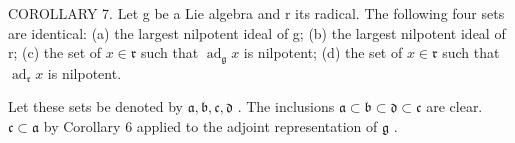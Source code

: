 COROLLARY 7. Let g be a Lie algebra and r its radical. The following four sets are identical: (a) the largest nilpotent ideal of g; (b) the largest nilpotent ideal of r; (c) the set of \(x \in \mathfrak{r}\) such that \(\operatorname{ad}_{\mathfrak{g}} x\) is nilpotent; (d) the set of \(x \in \mathfrak{r}\) such that \(\operatorname{ad}_{\mathfrak{r}} x\) is nilpotent.

Let these sets be denoted by \(\mathfrak{a}, \mathfrak{b}, \mathfrak{c}, \mathfrak{d}\) . The inclusions \(\mathfrak{a} \subset \mathfrak{b} \subset \mathfrak{d} \subset \mathfrak{c}\) are clear. \(\mathfrak{c} \subset \mathfrak{a}\) by Corollary 6 applied to the adjoint representation of \(\mathfrak{g}\) .

